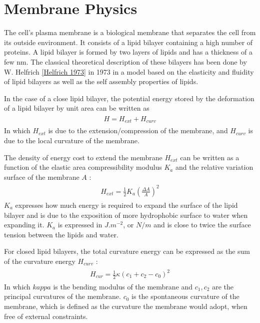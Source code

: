 \documentclass[A4paperpaper,11pt,english]{sphinxmanual}
\begin{document}
\section{Membrane Physics}
\label{index-latex:membrane-physics}
The cell's plasma membrane is a biological membrane that separates the cell from
its outside environment.  It consists of a lipid bilayer containing
a high number of proteins.  A lipid bilayer is formed by two layers of lipids and has a
thickness of a few nm. The classical theoretical description
of these bilayers has been done by W. Helfrich {\hyperref[index-latex:helfrich]{{[}Helfrich  1973{]}}} in 1973 in a
model based on the elasticity and fluidity of lipid bilayers as well as the
self assembly properties of  lipids.

In the case of a close lipid bilayer, the potential energy stored by the
deformation of a lipid bilayer by unit area can be  written as
\label{index-latex:equation-eqa1}\begin{gather}
\begin{split}H = H_{ext} + H_{curv}\end{split}\label{index-latex-eqa1}
\end{gather}
In which \(H_{ext}\) is due to the extension/compression of the membrane,
and \(H_{curv}\) is due to the local curvature of the membrane.

The density of energy cost to extend the membrane \(H_{ext}\) can be written as a
function  of the elastic area compressibility modulus \(K_a\) and the
relative variation surface of the membrane \(A\) :
\label{index-latex:equation-eqa2}\begin{gather}
\begin{split}H_{ext} = \frac 1 2 K_a \left(\frac{\Delta A}{A}\right)^2\end{split}\label{index-latex-eqa2}
\end{gather}
\(K_a\) expresses how much energy is required to expand the surface of the
lipid bilayer and is due to the exposition of more hydrophobic surface to water
when expanding it. \(K_a\) is expressed in \(J.m^{-2}\), or \(N/m\)
and is close to twice the surface tension between the lipids and water.

For closed lipid bilayers, the total curvature energy can be expressed as the
sum of the curvature energy \(H_{curv}\) :
\label{index-latex:equation-eqa3}\begin{gather}
\begin{split}H_{cur} = \frac 1 2 \kappa (c_1 + c_2 -c_0)^2\end{split}\label{index-latex-eqa3}
\end{gather}
In which \(kappa\) is the bending modulus of the membrane and \(c_1,c_2\)
are the principal curvatures of the membrane. \(c_0\) is the spontaneous
curvature of the membrane, which is defined as the curvature the membrane would adopt, when free of
external constraints.
\end{document}
